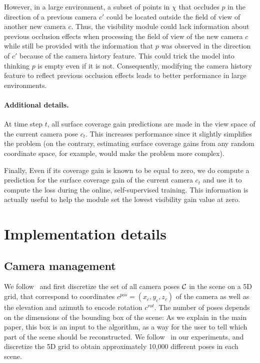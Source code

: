 However, in a large environment, a subset of points in $\chi$ that occludes $p$ in the direction of a previous camera $c'$ could be located outside the field of view of another new camera $c$. Thus, the visibility module could lack information about previous occlusion effects when processing the field of view of the new camera $c$ while still be provided with the information that $p$ was observed in the direction of $c'$ because of the camera history feature. This could trick the model into thinking $p$ is empty even if it is not. Consequently, modifying the camera history feature to reflect previous occlusion effects leads to better performance in large environments.

\paragraph{Additional details.} At time step $t$, all surface coverage gain predictions are made in the view space of the current camera pose $c_t$. This increases performance since it slightly simplifies the problem (on the contrary, estimating surface coverage gains from any random coordinate space, for example, would make the problem more complex).

Finally, Even if its coverage gain is known to be equal to zero, we do compute a prediction for the surface coverage gain of the current camera $c_t$ and use it to compute the loss during the online, self-supervised training. This information is actually useful to help the module set the lowest visibility gain value at zero.
%

\section{Implementation details}

\subsection{Camera management}

We follow~\cite{guedon-nips22-scone-surface-coverage} and first discretize the set of all camera poses ${\cal C}$ in the scene on a 5D grid, that correspond to coordinates $c^{pos} = (x_c, y_c, z_c)$ of the camera as well as the elevation and azimuth to encode rotation $c^{rot}$. The number of poses depends on the dimensions of the bounding box of the scene: As we explain in the main paper, this box is an input to the algorithm, as a way for the user to tell which part of the scene should be reconstructed. We follow~\cite{guedon-nips22-scone-surface-coverage} in our experiments, and discretize the 5D grid to obtain approximately 10,000 different poses in each scene.

